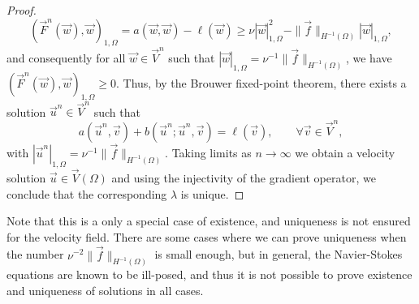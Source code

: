 \begin{theorem}
\begin{proof}
        \begin{equation*}
            (\vec F^n(\vec w), \vec w)_{1,\Omega} = a(\vec w, \vec w) - \ell(\vec w) \geq \nu|\vec w|^2_{1,\Omega} - \|\vec f\|_{H^{-1}(\Omega)}|\vec w|_{1,\Omega},
        \end{equation*}
        and consequently for all $\vec w\in\vec V^n$ such that $|\vec w|_{1,\Omega} = \nu^{-1}\|\vec f\|_{H^{-1}(\Omega)}$, we have $(\vec F^n(\vec w), \vec w)_{1,\Omega} \geq 0$. Thus, by the Brouwer fixed-point theorem, there exists a solution $\vec u^n\in\vec V^n$ such that 
        \begin{equation*}
            a(\vec u^n, \vec v) + b(\vec u^n; \vec u^n, \vec v)  = \ell(\vec v), \qquad \forall \vec v\in\vec V^n,
        \end{equation*}
        with $|\vec u^n|_{1,\Omega} = \nu^{-1}\|\vec f\|_{H^{-1}(\Omega)}$. Taking limits as $n\to\infty$ we obtain a velocity solution $\vec u\in\vec V(\Omega)$ and using the injectivity of the gradient operator, we conclude that the corresponding $\lambda$ is unique. 
    \end{proof}
\end{theorem}
Note that this is a only a special case of existence, and uniqueness is not ensured for the velocity field. There are some cases where we can prove uniqueness when the number $\nu^{-2}\|\vec f\|_{H^{-1}(\Omega)}$ is small enough, but in general, the Navier-Stokes equations are known to be ill-posed, and thus it is not possible to prove existence and uniqueness of solutions in all cases.

